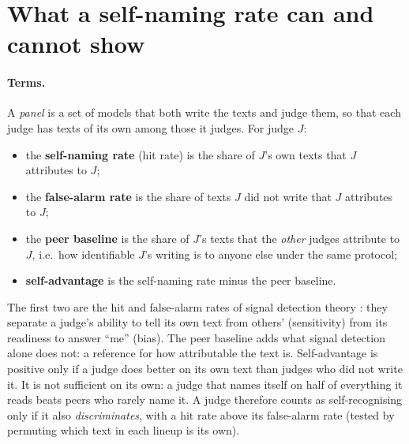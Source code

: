 \section{What a self-naming rate can and cannot show}
\label{sec:measure}

\paragraph{Terms.} A \emph{panel} is a set of models that both write the
texts and judge them, so that each judge has texts of its own among those it
judges. For judge $J$:
\begin{itemize}
\item the \textbf{self-naming rate} (hit rate) is the share of $J$'s own
texts that $J$ attributes to $J$;
\item the \textbf{false-alarm rate} is the share of texts $J$ did not write
that $J$ attributes to $J$;
\item the \textbf{peer baseline} is the share of $J$'s texts that the
\emph{other} judges attribute to $J$, i.e.\ how identifiable $J$'s writing is
to anyone else under the same protocol;
\item \textbf{self-advantage} is the self-naming rate minus the peer
baseline.
\end{itemize}
The first two are the hit and false-alarm rates of signal detection theory
\citep{green1966signal, macmillan2005detection}: they separate a judge's
ability to tell its own text from others' (sensitivity) from its readiness to
answer ``me'' (bias). The peer baseline adds what signal detection alone
does not: a reference for how attributable the text is. Self-advantage is
positive only if a judge does better on its own text than judges who did not
write it. It is not sufficient on its own: a judge that names itself on half
of everything it reads beats peers who rarely name it. A judge therefore
counts as self-recognising only if it also \emph{discriminates}, with a hit
rate above its false-alarm rate (tested by permuting which text in each
lineup is its own).

